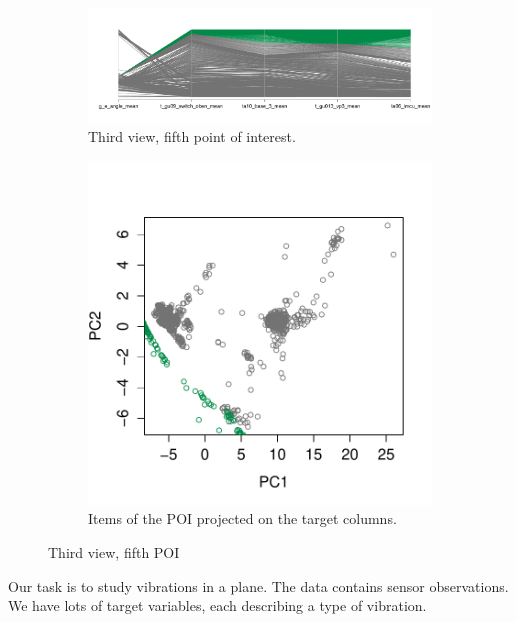 \begin{figure}[t!]
        \centering
        \begin{subfigure}[b]{0.75\textwidth}
                \includegraphics[width=\textwidth]{images/vibration_group_2}
                \caption{Third view, fifth point of interest.}
                \label{fig:vibration_group_1}
        \end{subfigure}%
        \begin{subfigure}[b]{0.25\textwidth}
                \includegraphics[width=\textwidth]{images/vibration_target_2}
                \caption{Items of the POI projected on the target columns.}
                \label{fig:/vibration_target_2}
        \end{subfigure}
        \caption{Third view, fifth POI}\label{fig:vibra-group2}
\end{figure}

Our task is to study vibrations in a plane. The data contains sensor
observations. We have lots of target variables, each describing a type of
vibration.

